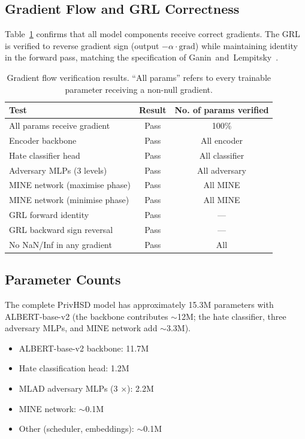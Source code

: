\documentclass{article}
\begin{document}
\subsection{Gradient Flow and GRL Correctness}

Table~\ref{tab:gradients} confirms that all model components receive
correct gradients. The GRL is verified to reverse gradient sign (output
$-\alpha \cdot \text{grad}$) while maintaining identity in the forward
pass, matching the specification of Ganin~and~Lempitsky~\cite{ganin2015unsupervised}.

\begin{table}[h]
  \centering
  \caption{Gradient flow verification results. ``All params'' refers to
           every trainable parameter receiving a non-null gradient.}
  \label{tab:gradients}
  \begin{tabular}{lcc}
    \toprule
    \textbf{Test} & \textbf{Result} & \textbf{No. of params verified} \\
    \midrule
    All params receive gradient & Pass & 100\% \\
    Encoder backbone & Pass & All encoder \\
    Hate classifier head & Pass & All classifier \\
    Adversary MLPs (3 levels) & Pass & All adversary \\
    MINE network (maximise phase) & Pass & All MINE \\
    MINE network (minimise phase) & Pass & All MINE \\
    GRL forward identity & Pass & --- \\
    GRL backward sign reversal & Pass & --- \\
    No NaN/Inf in any gradient & Pass & All \\
    \bottomrule
  \end{tabular}
\end{table}

\subsection{Parameter Counts}

The complete PrivHSD model has approximately 15.3M parameters with
ALBERT-base-v2 (the backbone contributes $\sim$12M; the hate classifier,
three adversary MLPs, and MINE network add $\sim$3.3M).
\begin{itemize}
  \item ALBERT-base-v2 backbone: 11.7M
  \item Hate classification head: 1.2M
  \item MLAD adversary MLPs (3 $\times$): 2.2M
  \item MINE network: $\sim$0.1M
  \item Other (scheduler, embeddings): $\sim$0.1M
\end{itemize}
\end{document}
